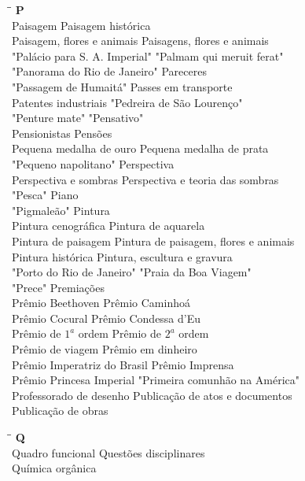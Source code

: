\begin{tabbing}
	\hspace{8,7cm}\=\hspace{1cm}\=\kill
	\textbf{P} \>  \\ 
	Paisagem \> Paisagem histórica\\
	Paisagem, flores e animais \> Paisagens, flores e animais\\
	"Palácio para S. A. Imperial"\> "Palmam qui meruit ferat"\\
	"Panorama do Rio de Janeiro" \> Pareceres\\ 
	"Passagem de Humaitá" \>  Passes em transporte\\ 
	Patentes industriais \> "Pedreira de São Lourenço"\\ 
	"Penture mate"  \> "Pensativo"\\
	Pensionistas \> Pensões\\
	Pequena medalha de ouro \> Pequena medalha de prata\\
	"Pequeno napolitano" \> Perspectiva\\
	Perspectiva e sombras \> Perspectiva e teoria das sombras\\
	"Pesca" \> Piano\\
	"Pigmaleão" \> Pintura\\
	Pintura cenográfica \> Pintura de aquarela\\
	Pintura de paisagem \> Pintura de paisagem, flores e animais\\
	Pintura histórica \> Pintura, escultura e gravura\\
	"Porto do Rio de Janeiro" \> "Praia da Boa Viagem"\\
	"Prece" \> Premiações\\
	Prêmio Beethoven\> Prêmio Caminhoá\\
	Prêmio Cocural \> Prêmio Condessa d'Eu\\ 
	Prêmio de $1^a$ ordem\> Prêmio de $2^a$ ordem\\ 
	Prêmio de viagem \> Prêmio em dinheiro\\
	Prêmio Imperatriz do Brasil \> Prêmio Imprensa\\
	Prêmio Princesa Imperial \> "Primeira comunhão na América"\\
	Professorado de desenho \> Publicação de atos e documentos\\
	Publicação de obras \> \\
\end{tabbing}

\begin{tabbing}
	\hspace{8,7cm}\=\hspace{1cm}\=\kill
	\textbf{Q} \>  \\ 
	Quadro funcional \> Questões disciplinares\\
	Química orgânica \> \\
\end{tabbing}

